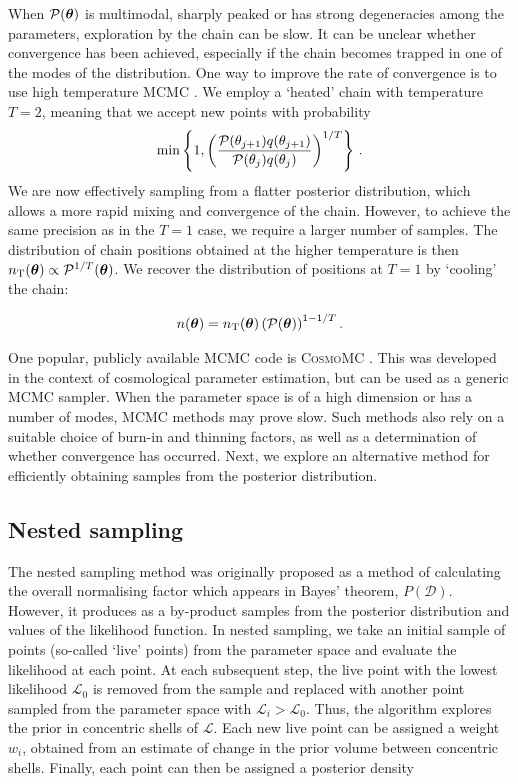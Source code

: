 When $\mathcal{P}(\boldsymbol\theta)$ is multimodal, sharply peaked or has strong degeneracies among the parameters, exploration by the chain can be slow. It can be unclear whether convergence has been achieved, especially if the chain becomes trapped in one of the modes of the distribution. One way to improve the rate of convergence is to use high temperature MCMC \cite{Kirkpatrick:1983,Lewis:2009}. We employ a `heated' chain with temperature $T = 2$, meaning that we accept new points with probability
\begin{equation}
\textrm{min}\left\{1, \left(\frac{\mathcal{P}(\bold\theta_{j+1})q(\bold\theta_{j+1})}{\mathcal{P}(\bold\theta_{j})q(\bold\theta_{j})}\right)^{1/T} \right\}\,.
\end{equation}
We are now effectively sampling from a flatter posterior distribution, which allows a more rapid mixing and convergence of the chain. However, to achieve the same precision as in the $T=1$ case, we require a larger number of samples. The distribution of chain positions obtained at the higher temperature is then \(n_\textrm{T}(\boldsymbol\theta) \propto \mathcal{P}^{1/T}(\boldsymbol\theta)\). We recover the distribution of positions at \(T=1\) by `cooling' the chain:

\begin{equation}
n(\boldsymbol\theta) = n_\textrm{T}(\boldsymbol\theta) \left(\mathcal{P}(\boldsymbol\theta)\right)^{1 - 1/T}.
\end{equation}


One popular, publicly available MCMC code is \textsc{CosmoMC} \cite{Lewis:2002}. This was developed in the context of cosmological parameter estimation, but can be used as a generic MCMC sampler. When the parameter space is of a high dimension or has a number of modes, MCMC methods may prove slow. Such methods also rely on a suitable choice of burn-in and thinning factors, as well as a determination of whether convergence has occurred. Next, we explore an alternative method for efficiently obtaining samples from the posterior distribution.

\subsection{Nested sampling}

The nested sampling method \cite{Skilling:2004} was originally proposed as a method of calculating the overall normalising factor which appears in Bayes' theorem, $P(\mathcal{D})$. However, it produces as a by-product samples from the posterior distribution and values of the likelihood function. In nested sampling, we take an initial sample of points (so-called `live' points) from the parameter space and evaluate the likelihood at each point. At each subsequent step, the live point with the lowest likelihood $\mathcal{L}_0$ is removed from the sample and replaced with another point sampled from the parameter space with $\mathcal{L}_i > \mathcal{L}_0$. Thus, the algorithm explores the prior in concentric shells of $\mathcal{L}$. Each new live point can be assigned a weight $w_i$, obtained from an estimate of change in the prior volume between concentric shells. Finally, each point can then be assigned a posterior density

